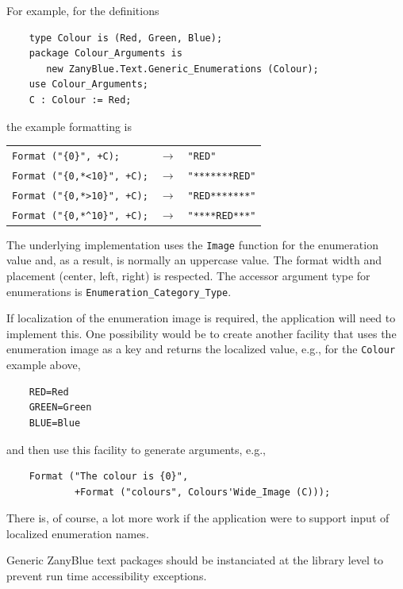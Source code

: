 For example, for the definitions
\begin{small}
\begin{verbatim}
    type Colour is (Red, Green, Blue);
    package Colour_Arguments is
       new ZanyBlue.Text.Generic_Enumerations (Colour);
    use Colour_Arguments;
    C : Colour := Red;
\end{verbatim}
\end{small}
the example formatting is
\begin{center}
\begin{tabular}{lll}
\verb|Format ("{0}", +C);| & $\rightarrow$ & \verb|"RED"|\\
\verb|Format ("{0,*<10}", +C);| & $\rightarrow$ & \verb|"*******RED"|\\
\verb|Format ("{0,*>10}", +C);| & $\rightarrow$ & \verb|"RED*******"|\\
\verb|Format ("{0,*^10}", +C);| & $\rightarrow$ & \verb|"****RED***"|
\end{tabular}
\end{center}
The underlying implementation uses the \verb|Image| function for the
enumeration value and, as a result, is normally an uppercase value.  The
format width and placement (center, left, right) is respected.
The accessor argument type for enumerations is
\texttt{Enumeration\_Category\_Type}.

If localization of the enumeration image is required, the application will
need to implement this.  One possibility would be to create another facility
that uses the enumeration image as a key and returns the localized value,
e.g., for the \verb|Colour| example above,
\begin{small}
\begin{verbatim}
    RED=Red
    GREEN=Green
    BLUE=Blue
\end{verbatim}
\end{small}
and then use this facility to generate arguments, e.g.,
\begin{small}
\begin{verbatim}
    Format ("The colour is {0}",
            +Format ("colours", Colours'Wide_Image (C)));
\end{verbatim}
\end{small}
There is, of course, a lot more work if the application were to support
input of localized enumeration names.

Generic ZanyBlue text packages should be instanciated at the library
level to prevent run time accessibility exceptions.

